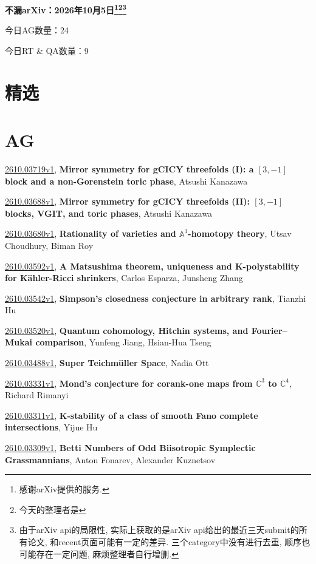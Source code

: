 \documentclass[9pt, a4paper]{article}
\theoremstyle{plain}
\theoremstyle{definition}
\theoremstyle{remark}
\newcommand{\arxiv}[3]{\href{https://arxiv.org/abs/#1}{#1}, \textbf{\textcolor{arxivblue}{#2}}, #3}
\newcommand{\AGnumber}{24}
\newcommand{\RTQAnumber}{9}
\newcommand{\NewestDate}{2026年10月5日}
\newcommand{\todayarXiver}{} %
\begin{document}
\begin{center}
    \Huge\textbf{不漏arXiv：\NewestDate\footnote{感谢arXiv提供的服务.}\footnote{今天的整理者是\todayarXiver}\footnote{由于arXiv api的局限性, 实际上获取的是arXiv api给出的最近三天submit的所有论文, 和recent页面可能有一定的差异. 三个category中没有进行去重, 顺序也可能存在一定问题, 麻烦整理者自行增删.}} \\
\end{center}

\setcounter{section}{-1}

\begin{center}
    今日AG数量：\AGnumber
    
    今日RT \& QA数量：\RTQAnumber
    
\end{center}


\section{精选}


\section{AG}
\arxiv{2610.03719v1}{Mirror symmetry for gCICY threefolds (I): a $[3,-1]$ block and a non-Gorenstein toric phase}{Atsushi Kanazawa}

\arxiv{2610.03688v1}{Mirror symmetry for gCICY threefolds (II): $[3,-1]$ blocks, VGIT, and toric phases}{Atsushi Kanazawa}

\arxiv{2610.03680v1}{Rationality of varieties and $\mathbb{A}^1$-homotopy theory}{Utsav Choudhury, Biman Roy}

\arxiv{2610.03592v1}{A Matsushima theorem, uniqueness and K-polystability for Kähler-Ricci shrinkers}{Carlos Esparza, Junsheng Zhang}

\arxiv{2610.03542v1}{Simpson's closedness conjecture in arbitrary rank}{Tianzhi Hu}

\arxiv{2610.03520v1}{Quantum cohomology, Hitchin systems, and Fourier--Mukai comparison}{Yunfeng Jiang, Hsian-Hua Tseng}

\arxiv{2610.03488v1}{Super Teichmüller Space}{Nadia Ott}

\arxiv{2610.03331v1}{Mond's conjecture for corank-one maps from $\mathbb C^3$ to $\mathbb C^4$}{Richard Rimanyi}

\arxiv{2610.03311v1}{K-stability of a class of smooth Fano complete intersections}{Yijue Hu}

\arxiv{2610.03309v1}{Betti Numbers of Odd Biisotropic Symplectic Grassmannians}{Anton Fonarev, Alexander Kuznetsov}
\end{document}
